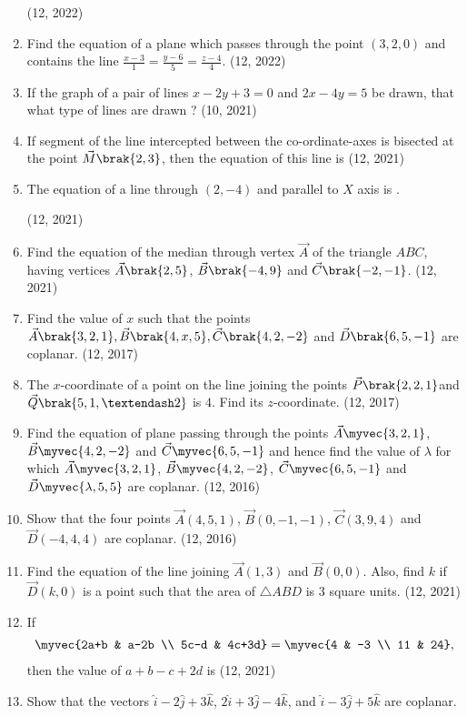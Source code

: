 \begin{enumerate}[label=\thesubsection.\arabic*, ref=\thesubsection.\theenumi]
	\hfill (12, 2022)
\item Find the equation of a plane which passes through the point $(3,2,0)$ and contains the line $\frac{x-3}{1}=\frac{y-6}{5}=\frac{z-4}{4}$. \hfill (12, 2022)
\item If the graph of a pair of lines $ x - 2y + 3 = 0 $ and $ 2x - 4y = 5 $ be drawn, that what type of lines are drawn ? \hfill (10, 2021)
\item If segment of the line intercepted between the co-ordinate-axes is bisected
at the point $\vec{M}\brak{2, 3}$, then the equation of this line is
\hfill (12, 2021)
\item The equation of a line through $(2,-4)$ and parallel to $X$ axis is \underline{\hspace{2cm}}. 

	\hfill (12, 2021)

\item Find the equation of the median through vertex $\vec{A}$ of the triangle $ABC$, having vertices $\vec{A}\brak{2,5}$, $\vec{B}\brak{-4,9}$ and $\vec{C}\brak{-2, -1}$. \hfill (12, 2021)
\item Find the value of $x$ such that the points $\vec{A}\brak{3,2,1}, \vec{B}\brak{4, x, 5}, \vec{C}\brak{4,2,-2}$ and $\vec{D}\brak{6,5,-1}$ are coplanar. \hfill (12, 2017)
\item The $x$-coordinate of a point on the line joining the points $\vec{P}\brak{2, 2, 1}$and $\vec{Q}\brak{5, 1,–2}$  is $4$. Find its $z$-coordinate. \hfill (12, 2017)
\item Find the equation of plane passing through the points $\vec{A}\myvec{3 , 2 , 1}$,
      $\vec{B}\myvec{4, 2, -2}$ and $\vec{C}\myvec{6, 5, -1}$ and hence find the value of $\lambda$ for which
      $\vec{A}\myvec{3, 2 , 1}$, $\vec{B}\myvec{4 , 2 , -2}$, $\vec{C}\myvec{6 , 5 , -1}$ and $\vec{D}\myvec{\lambda , 5 , 5}$
      are coplanar. \hfill (12, 2016)
\item Show that the four points $\vec{A}(4,5,1)$, $ \vec{B}(0,-1,-1)$,
      $\vec{C}(3,9,4)$ and $\vec{D}(-4,4,4)$ are coplanar. \hfill (12, 2016)
    \item Find the equation of the line joining $\vec{A}(1, 3)$ and $\vec{B}(0, 0)$.  Also, find $k$ if $\vec{D}(k, 0)$ is a point such that the area of $\triangle{ABD}$ is $3$ square units.
\hfill (12, 2021)
    \item If
\begin{align*}
\myvec{2a+b & a-2b \\ 5c-d & 4c+3d} = \myvec{4 & -3 \\ 11 & 24},
\end{align*}
then the value of $a + b - c + 2d$ is
\hfill (12, 2021)
\item Show that the vectors $\hat{i} - 2\hat{j} + 3\hat{k}$, $2\hat{i} + 3\hat{j} - 4\hat{k}$, and $\hat{i} - 3\hat{j} + 5\hat{k}$ are coplanar. 


\end{enumerate}
